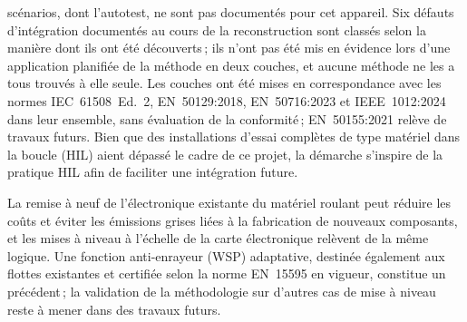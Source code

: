 scénarios, dont l’autotest, ne sont pas documentés pour cet appareil. Six défauts d’intégration documentés au cours de la reconstruction sont classés selon la manière dont ils ont été découverts ; ils n’ont pas été mis en évidence lors d’une application planifiée de la méthode en deux couches, et aucune méthode ne les a tous trouvés à elle seule. Les couches ont été mises en correspondance avec les normes IEC~61508~Ed.~2, EN~50129:2018, EN~50716:2023 et IEEE~1012:2024 dans leur ensemble, sans évaluation de la conformité ; EN~50155:2021 relève de travaux futurs. Bien que des installations d’essai complètes de type matériel dans la boucle (HIL) aient dépassé le cadre de ce projet, la démarche s’inspire de la pratique HIL afin de faciliter une intégration future.

La remise à neuf de l’électronique existante du matériel roulant peut réduire les coûts et éviter les émissions grises liées à la fabrication de nouveaux composants, et les mises à niveau à l’échelle de la carte électronique relèvent de la même logique. Une fonction anti-enrayeur (WSP) adaptative, destinée également aux flottes existantes et certifiée selon la norme EN~15595 en vigueur, constitue un précédent ; la validation de la méthodologie sur d’autres cas de mise à niveau reste à mener dans des travaux futurs.
